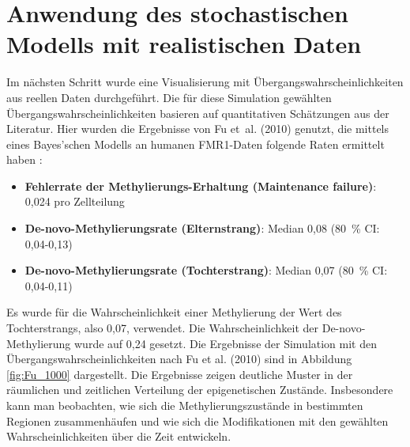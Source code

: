 \documentclass{SeminarV2}
\begin{document}
\section{Anwendung des stochastischen Modells mit realistischen Daten}
Im n\"{a}chsten Schritt wurde eine Visualisierung mit \"{U}bergangswahrscheinlichkeiten aus reellen Daten durchgef\"{u}hrt. Die f\"{u}r diese Simulation gew\"{a}hlten \"{U}bergangswahrscheinlichkeiten basieren auf quantitativen Sch\"{a}tzungen aus der Literatur.  
Hier wurden die Ergebnisse von Fu et al. (2010) genutzt, die mittels eines Bayes'schen Modells an humanen FMR1-Daten folgende Raten ermittelt haben \cite{fu-2010}:
\begin{itemize}
  \item \textbf{Fehlerrate der Methylierungs-Erhaltung (Maintenance failure)}: 0{,}024 pro Zellteilung  
  \item \textbf{De-novo-Methylierungsrate (Elternstrang)}: Median 0{,}08 (80 \% CI: 0,04-0,13)  
  \item \textbf{De-novo-Methylierungsrate (Tochterstrang)}: Median 0{,}07 (80 \% CI: 0,04-0,11)  
\end{itemize}
Es wurde für die Wahrscheinlichkeit einer Methylierung der Wert des Tochterstrangs,
also 0,07, verwendet. Die Wahrscheinlichkeit der De-novo-Methylierung wurde auf 0,24 gesetzt. Die Ergebnisse der Simulation mit den \"{U}bergangswahrscheinlichkeiten nach Fu et al. (2010) sind in Abbildung \ref{fig:Fu_1000} dargestellt.
Die Ergebnisse zeigen deutliche Muster in der r\"{a}umlichen und zeitlichen 
Verteilung der epigenetischen Zust\"{a}nde. Insbesondere kann man beobachten, wie sich die Methylierungszust\"{a}nde in bestimmten Regionen zusammenh\"{a}ufen und wie sich die Modifikationen mit den gewählten Wahrscheinlichkeiten \"{u}ber die Zeit entwickeln.
\end{document}
